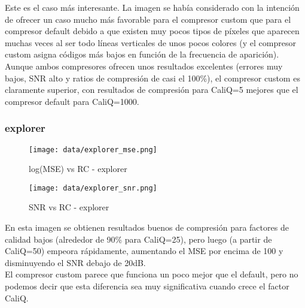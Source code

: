 \documentclass[12pt,a4paper]{article}
\begin{document}
Este es el caso más interesante. La imagen se había considerado con la intención de ofrecer un caso mucho más favorable para el compresor custom que para el compresor default debido a que existen muy pocos tipos de píxeles que aparecen muchas veces al ser todo líneas verticales de unos pocos colores (y el compresor custom asigna códigos más bajos en función de la frecuencia de aparición).\\

Aunque ambos compresores ofrecen unos resultados excelentes (errores muy bajos, SNR alto y ratios de compresión de casi el 100\%), el compresor custom es claramente superior, con resultados de compresión para CaliQ=5 mejores que el compresor default para CaliQ=1000.\\

\subsubsection{explorer}
\hspace*{-2.5em}
\begin{minipage}{0.5\textwidth}
        \centering
        \begin{figure}[H]
    \centering
    \texttt{[image: data/explorer\_mse.png]}
    \caption{log(MSE) vs RC - explorer}
    
\end{figure}
\end{minipage}\hfill
    \begin{minipage}{0.5\textwidth}
        \centering
        \begin{figure}[H]
    \centering
    \texttt{[image: data/explorer\_snr.png]}
    \caption{SNR vs RC - explorer}
    
\end{figure}
\end{minipage}
\vspace{2em}

En esta imagen se obtienen resultados buenos de compresión para factores de calidad bajos (alrededor de 90\% para CaliQ=25), pero luego (a partir de CaliQ=50) empeora rápidamente, aumentando el MSE por encima de 100 y disminuyendo el SNR debajo de 20dB.\\

El compresor custom parece que funciona un poco mejor que el default, pero no podemos decir que esta diferencia sea muy significativa cuando crece el factor CaliQ.\\
\end{document}
